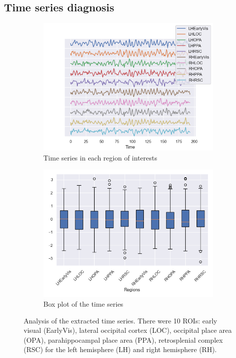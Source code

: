 \subsection{Time series diagnosis}
\begin{figure}
    \begin{subfigure}{\textwidth}
        \centering
        \includegraphics[height=.4\textheight]{img/plot_time_series.png}
        \caption{Time series in each region of interests}
        \label{fig:plot_TS}
    \end{subfigure}
    \begin{subfigure}{\textwidth}
        \centering
        \includegraphics[height=.4\textheight]{img/boxplot_time_series.png}
        \caption{Box plot of the time series}
        \label{fig:boxplot_TS}
    \end{subfigure}
    \caption{Analysis of the extracted time series. There were 10 ROIs: early visual (EarlyVis), lateral occipital cortex (LOC), occipital place area (OPA), parahippocampal place area (PPA), retrosplenial complex (RSC) for the left hemisphere (LH) and right hemisphere (RH).} 
    \label{fig:analysis_TS}
\end{figure}

